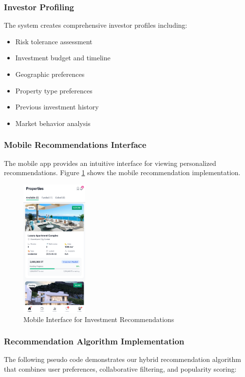 \subsubsection{Investor Profiling}
The system creates comprehensive investor profiles including:
\begin{itemize}
    \item Risk tolerance assessment
    \item Investment budget and timeline
    \item Geographic preferences
    \item Property type preferences
    \item Previous investment history
    \item Market behavior analysis
\end{itemize}

\subsubsection{Mobile Recommendations Interface}
The mobile app provides an intuitive interface for viewing personalized recommendations. Figure \ref{fig:recommendation-mobile} shows the mobile recommendation implementation.

\begin{figure}[htbp]
    \centering
    \includegraphics[width=0.3\textwidth]{images/recommendation_mobile.png}
    \caption{Mobile Interface for Investment Recommendations}
    \label{fig:recommendation-mobile}
\end{figure}

\subsubsection{Recommendation Algorithm Implementation}
The following pseudo code demonstrates our hybrid recommendation algorithm that combines user preferences, collaborative filtering, and popularity scoring:

